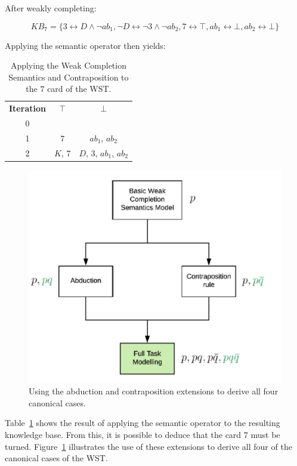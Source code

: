 \documentclass[
11pt, %
english, %
singlespacing, %
headsepline, %
]{MastersDoctoralThesis} %
\begin{document}
After weakly completing:

\[
KB_7 = \{3 \leftrightarrow D \land \lnot ab_1, \lnot D \leftrightarrow \lnot 3 \land \lnot ab_2, 7 \leftrightarrow \top, ab_1 \leftrightarrow \bot, ab_2 \leftrightarrow \bot \}
\]

Applying the semantic operator then yields:

\begin{table}
\begin{center}

\begin{tabular}{ c c c }
 \textbf{Iteration} & \textbf{$\top$} & \textbf{$\bot$} \\ 
 0 &  &  \\  
 1 &  $7$ & $ab_1$, $ab_2$  \\  
 2 &  $K$, $7$ & $D$, $3$, $ab_1$, $ab_2$  
\end{tabular}
\caption{Applying the Weak Completion Semantics and Contraposition to the $7$ card of the WST.}
\label{tbl:7cont}

\end{center}
\end{table}

\begin{figure}
\centering \includegraphics[scale=.6]{wstcano}
\caption{Using the abduction and contraposition extensions to derive all four canonical cases.}
\label{fig:wstcano}
\end{figure}



Table~\ref{tbl:7cont} shows the result of applying the semantic operator to the resulting knowledge base. From this, it is possible to deduce that the card $7$ must be turned. Figure~\ref{fig:wstcano} illustrates the use of these extensions to derive all four of the canonical cases of the WST.
\end{document}
